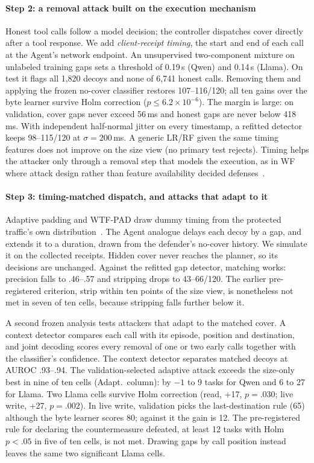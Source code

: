 \paragraph{Step 2: a removal attack built on the execution mechanism}
Honest tool calls follow a model decision; the controller dispatches cover directly after a tool response. We add \emph{client-receipt timing}, the start and end of each call at the Agent's network endpoint. An unsupervised two-component mixture on unlabeled training gaps sets a threshold of 0.19\,s (Qwen) and 0.14\,s (Llama). On test it flags all 1,820 decoys and none of 6,741 honest calls. Removing them and applying the frozen no-cover classifier restores 107--116/120; all ten gains over the byte learner survive Holm correction ($p\leq6.2\times10^{-6}$). The margin is large: on validation, cover gaps never exceed 56\,ms and honest gaps are never below 418\,ms. With independent half-normal jitter on every timestamp, a refitted detector keeps 98--115/120 at $\sigma=200$\,ms. A generic LR/RF given the same timing features does not improve on the size view (no primary test rejects). Timing helps the attacker only through a removal step that models the execution, as in WF where attack design rather than feature availability decided defenses~\cite{dyer2012peekaboo,rahman2020tiktok,mathews2023critical}.

\paragraph{Step 3: timing-matched dispatch, and attacks that adapt to it}
Adaptive padding and WTF-PAD draw dummy timing from the protected traffic's own distribution~\cite{shmatikov2006adaptive,juarez2016wtfpad}. The Agent analogue delays each decoy by a gap, and extends it to a duration, drawn from the defender's no-cover history. We simulate it on the collected receipts. Hidden cover never reaches the planner, so its decisions are unchanged. Against the refitted gap detector, matching works: precision falls to .46--.57 and stripping drops to 43--66/120. The earlier pre-registered criterion, strip within ten points of the size view, is nonetheless not met in seven of ten cells, because stripping falls further below it.

A second frozen analysis tests attackers that adapt to the matched cover. A context detector compares each call with its episode, position and destination, and joint decoding scores every removal of one or two early calls together with the classifier's confidence. The context detector separates matched decoys at AUROC .93--.94. The validation-selected adaptive attack exceeds the size-only best in nine of ten cells (Adapt.\ column): by $-1$ to 9 tasks for Qwen and 6 to 27 for Llama. Two Llama cells survive Holm correction (read, +17, $p=.030$; live write, +27, $p=.002$). In live write, validation picks the last-destination rule (65) although the byte learner scores 80; against it the gain is 12. The pre-registered rule for declaring the countermeasure defeated, at least 12 tasks with Holm $p<.05$ in five of ten cells, is not met. Drawing gaps by call position instead leaves the same two significant Llama cells.

